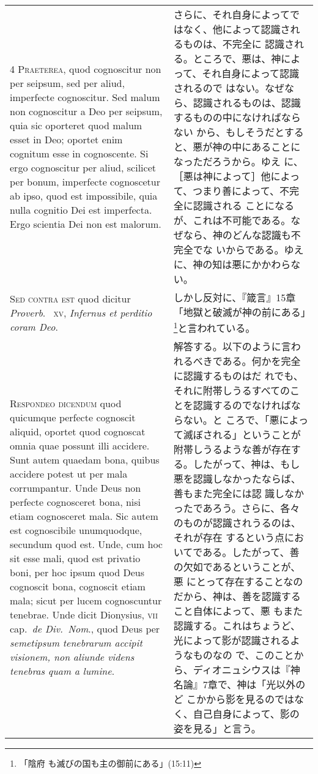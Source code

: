 \documentclass[10pt]{jsarticle} %
\begin{document}
\begin{longtable}{p{21em}p{21em}}
\\


{\scshape 4 Praeterea}, quod cognoscitur non per seipsum, sed per
aliud, imperfecte cognoscitur. Sed malum non cognoscitur a Deo per
seipsum, quia sic oporteret quod malum esset in Deo; oportet enim
cognitum esse in cognoscente. Si ergo cognoscitur per aliud, scilicet
per bonum, imperfecte cognoscetur ab ipso, quod est impossibile, quia
nulla cognitio Dei est imperfecta. Ergo scientia Dei non est malorum.

&

さらに、それ自身によってではなく、他によって認識されるものは、不完全に
認識される。ところで、悪は、神によって、それ自身によって認識されるので
はない。なぜなら、認識されるものは、認識するものの中になければならない
から、もしそうだとすると、悪が神の中にあることになっただろうから。ゆえ
に、［悪は神によって］他によって、つまり善によって、不完全に認識される
ことになるが、これは不可能である。なぜなら、神のどんな認識も不完全でな
いからである。ゆえに、神の知は悪にかかわらない。


\\


{\scshape Sed contra est} quod dicitur {\itshape Proverb}.~{\scshape
xv}, {\itshape Infernus et perditio coram Deo}.

&

しかし反対に、『箴言』15章「地獄と破滅が神の前にある」\footnote{「陰府
も滅びの国も主の御前にある」(15:11)}と言われている。


\\


{\scshape Respondeo dicendum} quod quicumque perfecte cognoscit
aliquid, oportet quod cognoscat omnia quae possunt illi accidere. Sunt
autem quaedam bona, quibus accidere potest ut per mala
corrumpantur. Unde Deus non perfecte cognosceret bona, nisi etiam
cognosceret mala. Sic autem est cognoscibile unumquodque, secundum
quod est. Unde, cum hoc sit esse mali, quod est privatio boni, per hoc
ipsum quod Deus cognoscit bona, cognoscit etiam mala; sicut per lucem
cognoscuntur tenebrae. Unde dicit Dionysius, {\scshape vii}
cap.~{\itshape de Div.~Nom}., quod Deus per {\itshape semetipsum
tenebrarum accipit visionem, non aliunde videns tenebras quam a
lumine}.

&

解答する。以下のように言われるべきである。何かを完全に認識するものはだ
れでも、それに附帯しうるすべてのことを認識するのでなければならない。と
ころで、「悪によって滅ぼされる」ということが附帯しうるような善が存在す
る。したがって、神は、もし悪を認識しなかったならば、善もまた完全には認
識しなかったであろう。さらに、各々のものが認識されうるのは、それが存在
するという点においてである。したがって、善の欠如であるということが、悪
にとって存在することなのだから、神は、善を認識すること自体によって、悪
もまた認識する。これはちょうど、光によって影が認識されるようなものなの
で、このことから、ディオニュシウスは『神名論』7章で、神は「光以外のど
こかから影を見るのではなく、自己自身によって、影の姿を見る」と言う。


\end{longtable}
\end{document}

